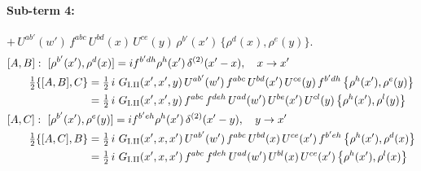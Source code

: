 \documentclass[10pt]{article}
\numberwithin{equation}{section}
\begin{document}
\paragraph{Sub-term 4:} $+\,U^{ab'}(w')\,f^{abc}\,U^{bd}(x)\,U^{ce}(y)\,\rho^{b'}(x')\,\big\{\rho^{d}(x),\rho^{e}(y)\big\}$.
\begin{align}
&[A,B]:\ [\rho^{b'}(x'),\rho^{d}(x)]=i f^{b'dh}\rho^{h}(x')\,\delta^{(2)}(x'-x),\quad x\to x'\notag\\
&\qquad \tfrac12\{[A,B],C\}=\tfrac12\,i\,\,G_{\rm I.II}(x',x',y)\,U^{ab'}(w')\,f^{abc}\,U^{bd}(x')\,U^{ce}(y)\,f^{b'dh}\,\big\{\rho^{h}(x'),\rho^{e}(y)\big\}\notag\\
&\qquad\phantom{\tfrac12\{[A,B],C\}}=\tfrac12\,i\,\,G_{\rm I.II}(x',x',y)\,f^{abc}\,f^{deh}\,U^{ad}(w')\,U^{be}(x')\,U^{cl}(y)\,\big\{\rho^{h}(x'),\rho^{l}(y)\big\}
\label{eq:GI.II-4-AB}\\
&[A,C]:\ [\rho^{b'}(x'),\rho^{e}(y)]=i f^{b'eh}\rho^{h}(x')\,\delta^{(2)}(x'-y),\quad y\to x'\notag\\
&\qquad \tfrac12\{[A,C],B\}=\tfrac12\,i\,\,G_{\rm I.II}(x',x,x')\,U^{ab'}(w')\,f^{abc}\,U^{bd}(x)\,U^{ce}(x')\,f^{b'eh}\,\big\{\rho^{h}(x'),\rho^{d}(x)\big\}\notag\\
&\qquad\phantom{\tfrac12\{[A,C],B\}}=\tfrac12\,i\,\,G_{\rm I.II}(x',x,x')\,f^{abc}\,f^{deh}\,U^{ad}(w')\,U^{bl}(x)\,U^{ce}(x')\,\big\{\rho^{h}(x'),\rho^{l}(x)\big\}
\label{eq:GI.II-4-AC}
\end{align}
\end{document}
